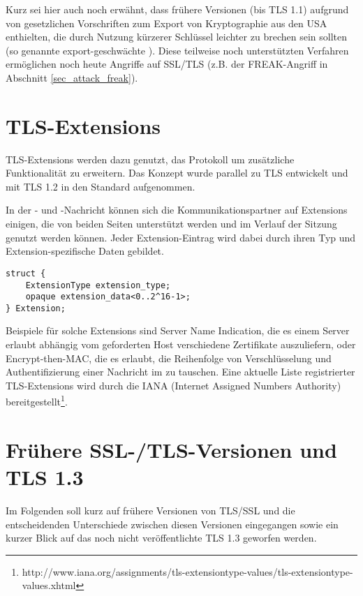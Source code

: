 Kurz sei hier auch noch erwähnt, dass frühere Versionen (bis TLS 1.1) aufgrund von gesetzlichen Vorschriften zum Export von Kryptographie aus den USA \ciphersuites{} enthielten, die durch Nutzung kürzerer Schlüssel leichter zu brechen sein sollten (so genannte export-geschwächte \ciphersuites{}). Diese teilweise noch unterstützten Verfahren ermöglichen noch heute Angriffe auf SSL/TLS (z.B. der FREAK-Angriff in Abschnitt \ref{sec_attack_freak}).

\section{TLS-Extensions}

\label{sec_tls_extensions}

TLS-Extensions werden dazu genutzt, das Protokoll um zusätzliche Funktionalität zu erweitern. Das Konzept wurde parallel zu TLS entwickelt und mit TLS 1.2 in den Standard aufgenommen.

In der \clienthello{}- und \serverhello{}-Nachricht können sich die Kommunikationspartner auf Extensions einigen, die von beiden Seiten unterstützt werden und im Verlauf der Sitzung genutzt werden können. Jeder Extension-Eintrag wird dabei durch ihren Typ und Extension-spezifische Daten gebildet. 
\begin{lstlisting}
struct {
	ExtensionType extension_type;
	opaque extension_data<0..2^16-1>;
} Extension;
\end{lstlisting}

Beispiele für solche Extensions sind Server Name Indication, die es einem Server erlaubt abhängig vom geforderten Host verschiedene Zertifikate auszuliefern, oder Encrypt-then-MAC, die es erlaubt, die Reihenfolge von Verschlüsselung und Authentifizierung einer Nachricht im \recordprotocol{} zu tauschen. Eine aktuelle Liste registrierter TLS-Extensions wird durch die IANA (Internet Assigned Numbers Authority) bereitgestellt\footnote{http://www.iana.org/assignments/tls-extensiontype-values/tls-extensiontype-values.xhtml}.

\section{Frühere SSL-/TLS-Versionen und TLS 1.3}
\label{sec_ssl_tls_version_overview}

Im Folgenden soll kurz auf frühere Versionen von TLS/SSL und die entscheidenden Unterschiede zwischen diesen Versionen eingegangen sowie ein kurzer Blick auf das noch nicht veröffentlichte TLS 1.3 geworfen werden.

